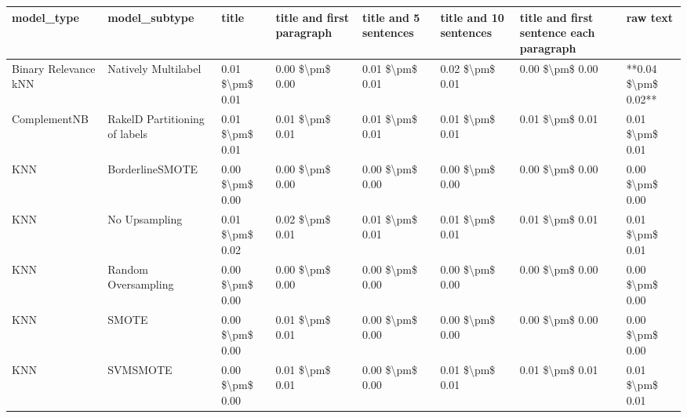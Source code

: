 \begin{tabular}{llllllll}
\toprule
                     model\_type &                 model\_subtype &           title & title and first paragraph & title and 5 sentences & title and 10 sentences & title and first sentence each paragraph &            raw text \\
\midrule
           Binary Relevance kNN &           Natively Multilabel & 0.01 \$\textbackslash pm\$ 0.01 &           0.00 \$\textbackslash pm\$ 0.00 &       0.01 \$\textbackslash pm\$ 0.01 &        0.02 \$\textbackslash pm\$ 0.01 &                         0.00 \$\textbackslash pm\$ 0.00 & **0.04 \$\textbackslash pm\$ 0.02** \\
                   ComplementNB & RakelD Partitioning of labels & 0.01 \$\textbackslash pm\$ 0.01 &           0.01 \$\textbackslash pm\$ 0.01 &       0.01 \$\textbackslash pm\$ 0.01 &        0.01 \$\textbackslash pm\$ 0.01 &                         0.01 \$\textbackslash pm\$ 0.01 &     0.01 \$\textbackslash pm\$ 0.01 \\
                            KNN &               BorderlineSMOTE & 0.00 \$\textbackslash pm\$ 0.00 &           0.00 \$\textbackslash pm\$ 0.00 &       0.00 \$\textbackslash pm\$ 0.00 &        0.00 \$\textbackslash pm\$ 0.00 &                         0.00 \$\textbackslash pm\$ 0.00 &     0.00 \$\textbackslash pm\$ 0.00 \\
                            KNN &                 No Upsampling & 0.01 \$\textbackslash pm\$ 0.02 &           0.02 \$\textbackslash pm\$ 0.01 &       0.01 \$\textbackslash pm\$ 0.01 &        0.01 \$\textbackslash pm\$ 0.01 &                         0.01 \$\textbackslash pm\$ 0.01 &     0.01 \$\textbackslash pm\$ 0.01 \\
                            KNN &           Random Oversampling & 0.00 \$\textbackslash pm\$ 0.00 &           0.00 \$\textbackslash pm\$ 0.00 &       0.00 \$\textbackslash pm\$ 0.00 &        0.00 \$\textbackslash pm\$ 0.00 &                         0.00 \$\textbackslash pm\$ 0.00 &     0.00 \$\textbackslash pm\$ 0.00 \\
                            KNN &                         SMOTE & 0.00 \$\textbackslash pm\$ 0.00 &           0.01 \$\textbackslash pm\$ 0.01 &       0.00 \$\textbackslash pm\$ 0.00 &        0.00 \$\textbackslash pm\$ 0.00 &                         0.00 \$\textbackslash pm\$ 0.00 &     0.00 \$\textbackslash pm\$ 0.00 \\
                            KNN &                      SVMSMOTE & 0.00 \$\textbackslash pm\$ 0.00 &           0.01 \$\textbackslash pm\$ 0.01 &       0.00 \$\textbackslash pm\$ 0.00 &        0.01 \$\textbackslash pm\$ 0.01 &                         0.01 \$\textbackslash pm\$ 0.01 &     0.01 \$\textbackslash pm\$ 0.01 \\

\end{tabular}
